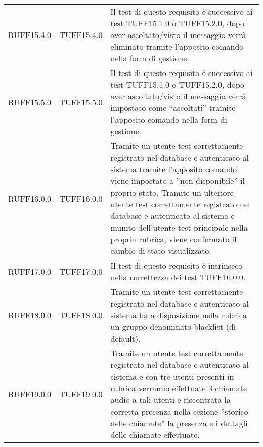 \begin{center}
\begin{longtable}{llp{}}
RUFF15.4.0 & TUFF15.4.0& Il test di questo requisito è successivo ai test TUFF15.1.0 o TUFF15.2.0, dopo aver ascoltato/visto il messaggio verrà eliminato tramite l'apposito comando nella form di gestione.\\
RUFF15.5.0 & TUFF15.5.0& Il test di questo requisito è successivo ai test TUFF15.1.0 o TUFF15.2.0, dopo aver ascoltato/visto il messaggio verrà impostato come ``ascoltati'' tramite l'apposito comando nella form di gestione.\\
RUFF16.0.0 & TUFF16.0.0&  Tramite un utente test correttamente registrato nel database e autenticato al sistema tramite l'apposito comando viene impostato a ''non disponibile'' il proprio stato. Tramite un ulteriore utente test correttamente registrato nel database e autenticato al sistema e munito dell'utente test principale nella propria rubrica, viene confermato il cambio di stato visualizzato.\\
RUFF17.0.0 & TUFF17.0.0& Il test di questo requisito è intrinseco nella correttezza dei test TUFF16.0.0.\\
RUFF18.0.0 & TUFF18.0.0& Tramite un utente test correttamente registrato nel database e autenticato al sistema ha a disposizione nella rubrica un gruppo denominato blacklist (di default).\\
RUFF19.0.0 & TUFF19.0.0& Tramite un utente test correttamente registrato nel database e autenticato al sistema e con tre utenti presenti in rubrica verranno effettuate 3 chiamate audio a tali utenti e riscontrata la corretta presenza nella sezione ''storico delle chiamate'' la presenza e i dettagli delle chiamate effettuate.\\



\end{longtable}
\end{center}
